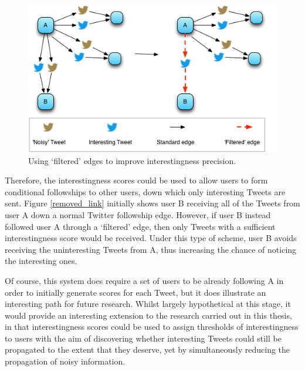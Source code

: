 \begin{figure}[h]
\centering
\includegraphics[scale=0.8]{6.Conclusions/Media/retweet_path.png} 
\caption{Using `filtered' edges to improve interestingness precision.}
\label{fig:removed_link}
\end{figure}

Therefore, the interestingness scores could be used to allow users to form conditional followships to other users, down which only interesting Tweets are sent. Figure \ref{removed_link} initially shows user B receiving all of the Tweets from user A down a normal Twitter followship edge. However, if user B instead followed user A through a `filtered' edge, then only Tweets with a sufficient interestingness score would be received. Under this type of scheme, user B avoids receiving the uninteresting Tweets from A, thus increasing the chance of noticing the interesting ones.


Of course, this system does require a set of users to be already following A in order to initially generate scores for each Tweet, but it does illustrate an interesting path for future research. Whilst largely hypothetical at this stage, it would provide an interesting extension to the research carried out in this thesis, in that interestingness scores could be used to assign thresholds of interestingness to users with the aim of discovering whether interesting Tweets could still be propagated to the extent that they deserve, yet by simultaneously reducing the propagation of noisy information. 

